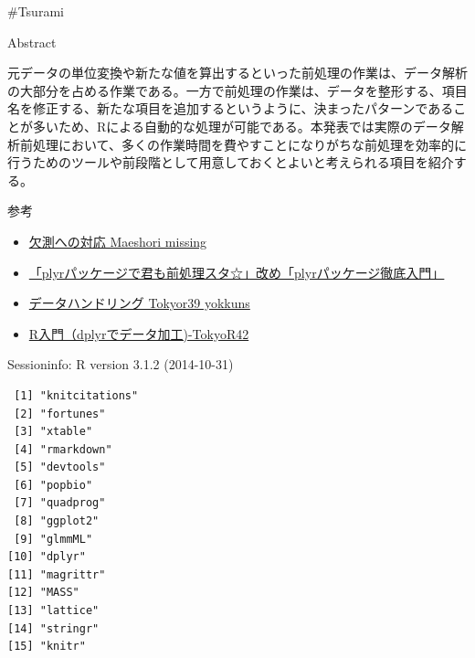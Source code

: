 \documentclass[17pt,ignorenonframetext,]{beamer}
\begin{document}
\begin{frame}{\#Tsurami}


\end{frame}

\begin{frame}


\end{frame}

\begin{frame}


\end{frame}

\begin{frame}{Abstract}

元データの単位変換や新たな値を算出するといった前処理の作業は、データ解析の大部分を占める作業である。一方で前処理の作業は、データを整形する、項目名を修正する、新たな項目を追加するというように、決まったパターンであることが多いため、Rによる自動的な処理が可能である。本発表では実際のデータ解析前処理において、多くの作業時間を費やすことになりがちな前処理を効率的に行うためのツールや前段階として用意しておくとよいと考えられる項目を紹介する。

\end{frame}

\begin{frame}{参考}

\begin{itemize}
\itemsep1pt\parskip0pt
\item
  \href{http://www.slideshare.net/dichika/maeshori-missing}{欠測への対応
  Maeshori missing}
\item
  \href{http://www.slideshare.net/teramonagi/tokyo-r30-20130420}{「plyrパッケージで君も前処理スタ☆」改め「plyrパッケージ徹底入門」}
\item
  \href{http://www.slideshare.net/yokkuns/tokyor39-yokkuns}{データハンドリング
  Tokyor39 yokkuns}
\item
  \href{http://www.slideshare.net/gepuro/rdplyrtokyor42}{R入門（dplyrでデータ加工)-TokyoR42}
\end{itemize}

\end{frame}

\begin{frame}[fragile]{\small{Sessioninfo: R version 3.1.2 (2014-10-31)}}

\begin{verbatim}
 [1] "knitcitations"
 [2] "fortunes"     
 [3] "xtable"       
 [4] "rmarkdown"    
 [5] "devtools"     
 [6] "popbio"       
 [7] "quadprog"     
 [8] "ggplot2"      
 [9] "glmmML"       
[10] "dplyr"        
[11] "magrittr"     
[12] "MASS"         
[13] "lattice"      
[14] "stringr"      
[15] "knitr"        
\end{verbatim}

\end{frame}
\end{document}
